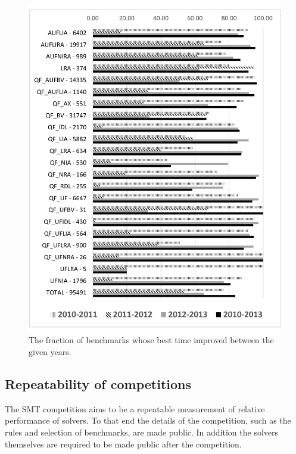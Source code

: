 \documentclass[smallcondensed]{svjour3}
\begin{document}
\begin{figure}
\centering
%
\includegraphics[width=\textwidth]{bettertime.pdf}
\caption{The fraction of benchmarks whose best time improved between the given years.}
\label{Fig:bettertime}
\end{figure}


\subsection{Repeatability of competitions}
\label{CompetitionRepeatability}

The SMT competition aims to be a repeatable measurement of relative performance of solvers. To that end the details of the competition, such as the rules and selection of benchmarks, are made public. In addition the solvers themselves are required to be made public after the competition.
\end{document}
